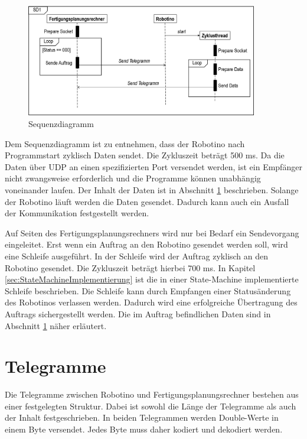 \begin{figure}[htb]
    \centering
    \includegraphics[width=0.9\textwidth]{Abbildungen/Sequenzdiagramm.PNG}
    \caption{Sequenzdiagramm}		
    \label{fig:Sequenzdiagramm}
\end{figure}

Dem Sequenzdiagramm ist zu entnehmen, dass der Robotino nach Programmstart zyklisch Daten sendet. Die Zykluszeit beträgt 500 ms. Da die Daten über UDP an einen spezifizierten Port versendet werden, ist ein Empfänger nicht zwangsweise erforderlich und die Programme können unabhängig voneinander laufen. Der Inhalt der Daten ist in Abschnitt \ref{sec:Telegramme} beschrieben. Solange der Robotino läuft werden die Daten gesendet. Dadurch kann auch ein Ausfall der Kommunikation festgestellt werden. 

Auf Seiten des Fertigungsplanungsrechners wird nur bei Bedarf ein Sendevorgang eingeleitet. Erst wenn ein Auftrag an den Robotino gesendet werden soll, wird eine Schleife ausgeführt. In der Schleife wird der Auftrag zyklisch an den Robotino gesendet. Die Zykluszeit beträgt hierbei 700 ms. In Kapitel \ref{sec:StateMachineImplementierung} ist die in einer State-Machine implementierte Schleife beschrieben. Die Schleife kann durch Empfangen einer Statusänderung des Robotinos verlassen werden. Dadurch wird eine erfolgreiche Übertragung des Auftrags sichergestellt werden. Die im Auftrag befindlichen Daten sind in Abschnitt \ref{sec:Telegramme} näher erläutert.

\section{Telegramme}
\label{sec:Telegramme}

Die Telegramme zwischen Robotino und Fertigungsplanungsrechner bestehen aus einer festgelegten Struktur. Dabei ist sowohl die Länge der Telegramme als auch der Inhalt festgeschrieben. In beiden Telegrammen werden Double-Werte in einem Byte versendet. Jedes Byte muss daher kodiert und dekodiert werden. 

